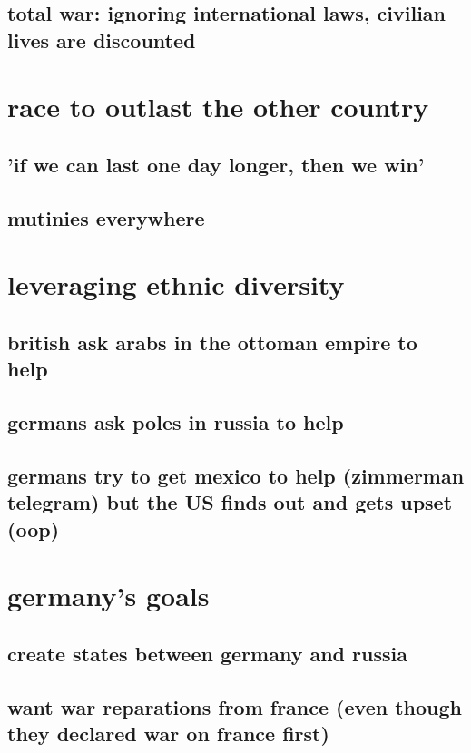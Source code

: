 \documentclass[letterpaper]{article}
\begin{document}
\subsection{total war: ignoring international laws, civilian lives are discounted}
\label{sec:orgd8535b2}
\section{race to outlast the other country}
\label{sec:org6c72eaf}
\subsection{'if we can last one day longer, then we win'}
\label{sec:orgfcf398e}
\subsection{mutinies everywhere}
\label{sec:org3ea2cf2}
\section{leveraging ethnic diversity}
\label{sec:orgb879766}
\subsection{british ask arabs in the ottoman empire to help}
\label{sec:org70020c2}
\subsection{germans ask poles in russia to help}
\label{sec:org955880f}
\subsection{germans try to get mexico to help (zimmerman telegram) but the US finds out and gets upset (oop)}
\label{sec:org2caa800}
\section{germany's goals}
\label{sec:org6cbfb7e}
\subsection{create states between germany and russia}
\label{sec:org8858006}
\subsection{want war reparations from france (even though they declared war on france first)}
\label{sec:orgcae9f41}
\end{document}
